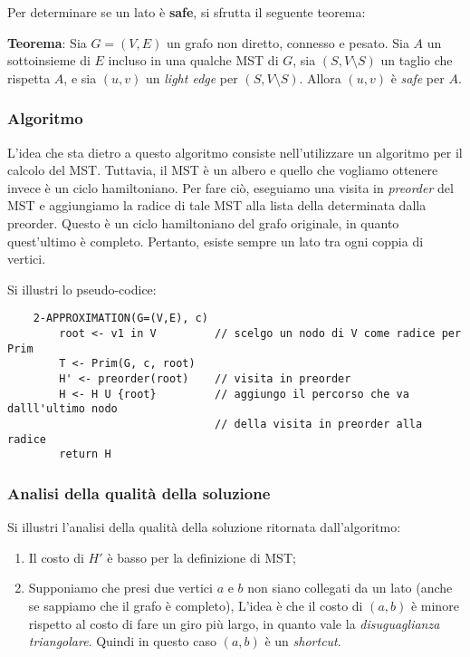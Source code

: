 Per determinare se un lato è \textbf{safe}, si sfrutta il seguente teorema:

\textbf{Teorema}: Sia $G = (V, E)$ un grafo non diretto, connesso e pesato. Sia $A$ un
sottoinsieme di $E$ incluso in una qualche MST di $G$, sia $(S, V \setminus S)$ un
taglio che rispetta $A$, e sia $(u, v)$ un \textit{light edge} per $(S, V \setminus S)$.
Allora $(u, v)$ è \textit{safe} per $A$.

\subsubsection{Algoritmo}

L'idea che sta dietro a questo algoritmo consiste nell'utilizzare un algoritmo per il calcolo
del MST. Tuttavia, il MST è un albero e quello che vogliamo ottenere invece è un
ciclo hamiltoniano. Per fare ciò, eseguiamo una visita in \textit{preorder} del MST
e aggiungiamo la radice di tale MST alla lista della determinata dalla preorder. Questo è un ciclo
hamiltoniano del grafo originale, in quanto quest'ultimo è completo. Pertanto, esiste sempre un
lato tra ogni coppia di vertici.

Si illustri lo pseudo-codice:
\begin{verbatim}
    2-APPROXIMATION(G=(V,E), c)
        root <- v1 in V         // scelgo un nodo di V come radice per Prim
        T <- Prim(G, c, root)
        H' <- preorder(root)    // visita in preorder
        H <- H U {root}         // aggiungo il percorso che va dalll'ultimo nodo
                                // della visita in preorder alla radice
        return H

\end{verbatim}

\subsubsection{Analisi della qualità della soluzione}

Si illustri l'analisi della qualità della soluzione ritornata dall'algoritmo:
\begin{enumerate}
    \item Il costo di $H'$ è basso per la definizione di MST;
    \item Supponiamo che presi due vertici $a$ e $b$ non siano collegati da un lato (anche se
    sappiamo che il grafo è completo), L'idea è che il costo di $(a, b)$ è minore rispetto
    al costo di fare un giro più largo, in quanto vale la \textit{disuguaglianza triangolare}.
    Quindi in questo caso $(a, b)$ è un \textit{shortcut}.
\end{enumerate}

